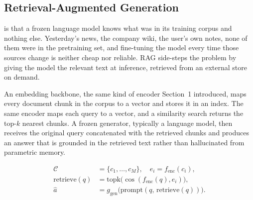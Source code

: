 \subsection{Retrieval-Augmented Generation}

 is that a frozen language model knows what was in its training corpus and nothing else. Yesterday's news, the company wiki, the user's own notes, none of them were in the pretraining set, and fine-tuning the model every time those sources change is neither cheap nor reliable. RAG\cite{Lewis2020RAG} side-steps the problem by giving the model the relevant text at inference, retrieved from an external store on demand.

 An embedding backbone, the same kind of encoder Section~1 introduced, maps every document chunk in the corpus to a vector and stores it in an index. The same encoder maps each query to a vector, and a similarity search returns the top-$k$ nearest chunks. A frozen generator, typically a language model, then receives the original query concatenated with the retrieved chunks and produces an answer that is grounded in the retrieved text rather than hallucinated from parametric memory.

\begin{align*}
    \mathcal{C} &= \{c_1, \ldots, c_M\}, \quad e_i = f_{\text{enc}}(c_i), \\
    \text{retrieve}(q) &= \mathrm{topk}\bigl( \cos(f_{\text{enc}}(q), e_i) \bigr), \\
    \hat{a} &= g_{\text{gen}}\bigl( \text{prompt}(q,\, \text{retrieve}(q)) \bigr).
\end{align*}

